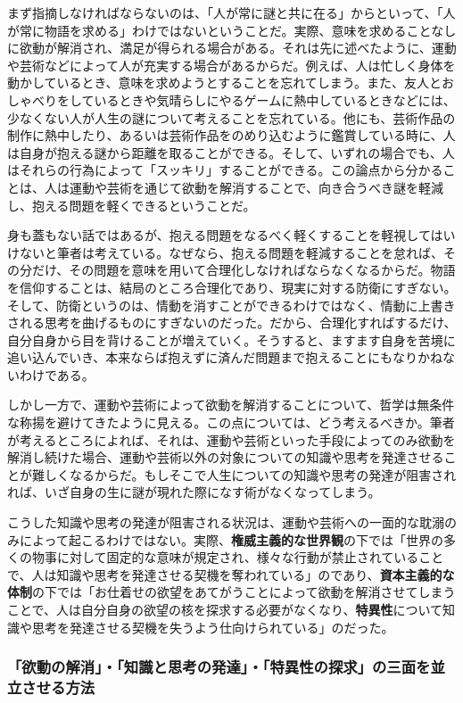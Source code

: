 まず指摘しなければならないのは、「人が常に謎と共に在る」からといって、「人が常に物語を求める」わけではないということだ。実際、意味を求めることなしに欲動が解消され、満足が得られる場合がある。それは先に述べたように、運動や芸術などによって人が充実する場合があるからだ。例えば、人は忙しく身体を動かしているとき、意味を求めようとすることを忘れてしまう。また、友人とおしゃべりをしているときや気晴らしにやるゲームに熱中しているときなどには、少なくない人が人生の謎について考えることを忘れている。他にも、芸術作品の制作に熱中したり、あるいは芸術作品をのめり込むように鑑賞している時に、人は自身が抱える謎から距離を取ることができる。そして、いずれの場合でも、人はそれらの行為によって「スッキリ」することができる。この論点から分かることは、人は運動や芸術を通じて欲動を解消することで、向き合うべき謎を軽減し、抱える問題を軽くできるということだ。

身も蓋もない話ではあるが、抱える問題をなるべく軽くすることを軽視してはいけないと筆者は考えている。なぜなら、抱える問題を軽減することを怠れば、その分だけ、その問題を意味を用いて合理化しなければならなくなるからだ。物語を信仰することは、結局のところ合理化であり、現実に対する防衛にすぎない。そして、防衛というのは、情動を消すことができるわけではなく、情動に上書きされる思考を曲げるものにすぎないのだった。だから、合理化すればするだけ、自分自身から目を背けることが増えていく。そうすると、ますます自身を苦境に追い込んでいき、本来ならば抱えずに済んだ問題まで抱えることにもなりかねないわけである。

しかし一方で、運動や芸術によって欲動を解消することについて、哲学は無条件な称揚を避けてきたように見える。この点については、どう考えるべきか。筆者が考えるところによれば、それは、運動や芸術といった手段によってのみ欲動を解消し続けた場合、運動や芸術以外の対象についての知識や思考を発達させることが難しくなるからだ。もしそこで人生についての知識や思考の発達が阻害されれば、いざ自身の生に謎が現れた際になす術がなくなってしまう。

こうした知識や思考の発達が阻害される状況は、運動や芸術への一面的な耽溺のみによって起こるわけではない。実際、\textbf{権威主義的な世界観}の下では「世界の多くの物事に対して固定的な意味が規定され、様々な行動が禁止されていることで、人は知識や思考を発達させる契機を奪われている」のであり、\textbf{資本主義的な体制}の下では「お仕着せの欲望をあてがうことによって欲動を解消させてしまうことで、人は自分自身の欲望の核を探求する必要がなくなり、\textbf{特異性}について知識や思考を発達させる契機を失うよう仕向けられている」のだった。

\subsubsection{「欲動の解消」・「知識と思考の発達」・「特異性の探求」の三面を並立させる方法}\label{ux6b32ux52d5ux306eux89e3ux6d88ux77e5ux8b58ux3068ux601dux8003ux306eux767aux9054ux7279ux7570ux6027ux306eux63a2ux6c42ux306eux4e09ux9762ux3092ux4e26ux7acbux3055ux305bux308bux65b9ux6cd5}

